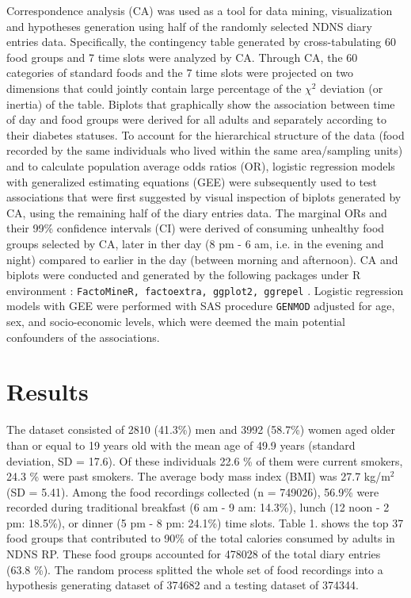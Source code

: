 \documentclass{bmcart}
\begin{document}
Correspondence analysis (CA) \cite{greenacre2017correspondence,Chapman2017,palla2020adolescents} was used as a tool for data mining, visualization and hypotheses generation using half of the randomly selected NDNS diary entries data. Specifically, the contingency table generated by cross-tabulating 60 food groups and 7 time slots were analyzed by CA. Through CA, the 60 categories of standard foods and the 7 time slots were projected on two dimensions that could jointly contain large percentage of the $\chi^2$ deviation (or inertia) of the table. Biplots that graphically show the association between time of day and food groups were derived for all adults and separately according to their diabetes statuses. To account for the hierarchical structure of the data (food recorded by the same individuals who lived within the same area/sampling units) and to calculate population average odds ratios (OR), logistic regression models with generalized estimating equations (GEE) were subsequently used to test associations that were first suggested by visual inspection of biplots generated by CA, using the remaining half of the diary entries data. The marginal ORs and their 99\% confidence intervals (CI) were derived of consuming unhealthy food groups selected by CA, later in ther day (8 pm - 6 am, i.e. in the evening and night) compared to earlier in the day (between morning and afternoon). CA and biplots were conducted and generated by the following packages under R environment \cite{Rcoreteam}: \texttt{FactoMineR, factoextra, ggplot2, ggrepel} \cite{L__2008,factoextra,ggplot2,ggrepel}. Logistic regression models with GEE were performed with SAS procedure \texttt{GENMOD} \cite{SAS94} adjusted for age, sex, and socio-economic levels, which were deemed the main potential confounders of the associations. 


\section*{Results}
The dataset consisted of 2810 (41.3\%) men and 3992 (58.7\%) women aged older than or equal to 19 years old with the mean age of 49.9 years (standard deviation, SD = 17.6). Of these individuals 22.6 \% of them were current smokers, 24.3 \% were past smokers. The average body mass index (BMI) was 27.7 kg/m$^2$ (SD = 5.41). Among the food recordings collected (n = 749026), 56.9\% were recorded during traditional breakfast (6 am - 9 am: 14.3\%), lunch (12 noon - 2 pm: 18.5\%), or dinner (5 pm - 8 pm: 24.1\%) time slots. Table 1. shows the top 37 food groups that contributed to 90\% of the total calories consumed by adults in NDNS RP. These food groups accounted for 478028 of the total diary entries (63.8 \%). The random process splitted the whole set of food recordings into a hypothesis generating dataset of 374682 and a testing dataset of 374344. 
\end{document}
